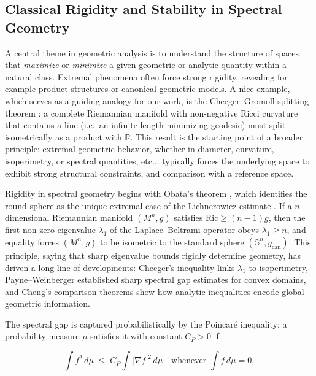 \documentclass[10pt,a4paper,reqno]{amsart}
\begin{document}
\subsection{Classical Rigidity and Stability in Spectral Geometry}\label{1.1}

A central theme in geometric analysis is to understand the structure of spaces
that \emph{maximize} or \emph{minimize} a
given geometric or analytic quantity within a natural class.  Extremal
phenomena often force strong rigidity, revealing for example product structures or
canonical geometric models.  A nice example, which serves as a guiding
analogy for our work, is the Cheeger--Gromoll splitting theorem
\cite{CheegerGromoll}: a complete Riemannian manifold with non-negative Ricci
curvature that contains a line (i.e.\ an infinite-length minimizing geodesic)
must split isometrically as a product with $\mathbb{R}$.  This result
is the starting point of a broader principle: extremal geometric behavior, whether in
diameter, curvature, isoperimetry, or spectral quantities, etc... typically forces
the underlying space to exhibit strong structural constraints, and comparison with a reference space.
\par\vspace{0.5em}
Rigidity in spectral geometry begins with Obata’s theorem \cite{Obata}, which
identifies the round sphere as the unique extremal case of the Lichnerowicz
estimate \cite{Lich}.  If a $n$-dimensional Riemannian manifold $(M^n,g)$ satisfies
$\mathrm{Ric}\ge (n-1)g$,
then the first non-zero eigenvalue $\lambda_1$ of the Laplace--Beltrami
operator obeys $\lambda_1 \ge n$, and equality forces $(M^n,g)$ to be isometric to the standard sphere
$(\mathbb{S}^n,g_{\mathrm{can}})$.  This principle, saying that sharp eigenvalue
bounds rigidly determine geometry, has driven a long line of developments:
Cheeger’s inequality \cite{Cheeger} links $\lambda_1$ to isoperimetry,
Payne--Weinberger \cite{PayneWeinberger} established sharp spectral gap
estimates for convex domains, and Cheng’s comparison theorems \cite{Cheng}
show how analytic inequalities encode global geometric information.

\medskip

The spectral gap is captured probabilistically by the Poincaré inequality: a probability measure $\mu$ satisfies it with constant $C_P>0$ if


\[
\int f^2\,d\mu \;\le\; C_P \int |\nabla f|^2\,d\mu
\quad\text{whenever }\int f\,d\mu=0,
\]
\end{document}
